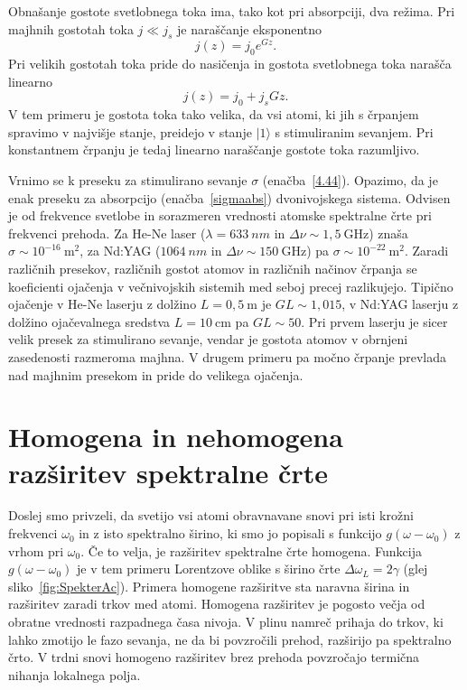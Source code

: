 Obnašanje gostote svetlobnega toka ima, tako kot pri absorpciji, dva režima. 
Pri majhnih gostotah toka $j\ll j_{s}$ je naraščanje eksponentno 
\begin{equation}
j(z)=j_{0}e^{Gz}.
\label{4.45}
\end{equation}
Pri velikih gostotah toka pride do nasičenja in gostota svetlobnega
toka narašča linearno
\begin{equation}
j(z)=j_{0}+j_{s}Gz.
\label{4.46}
\end{equation}
V tem primeru je gostota toka tako velika, da vsi atomi, ki jih
s črpanjem spravimo v najvišje stanje, preidejo v stanje $|1\rangle$
s stimuliranim sevanjem. Pri konstantnem črpanju je tedaj 
linearno naraščanje gostote toka razumljivo. 

Vrnimo se k preseku za stimulirano sevanje $\sigma$
 (enačba~\ref{4.44}). Opazimo, da je enak preseku za
absorpcijo (enačba~\ref{sigmaabs}) dvonivojskega sistema.
Odvisen je od frekvence svetlobe in sorazmeren vrednosti atomske spektralne 
črte pri frekvenci prehoda. Za He-Ne laser 
($\lambda=633~\si{nm}$ in $\Delta \nu \sim 1,5~\si{\giga\hertz}$) znaša   
$\sigma \sim 10^{-16}~\si{\metre}^2$, 
za Nd:YAG ($1064~\si{nm}$ in $\Delta \nu \sim 150~\si{\giga\hertz}$)
pa  $\sigma \sim 10^{-22}~\si{\metre}^2$.
Zaradi različnih presekov, različnih gostot atomov in različnih načinov črpanja se 
koeficienti ojačenja v večnivojskih sistemih med seboj precej razlikujejo. Tipično
ojačenje v He-Ne laserju z dolžino $L = 0,5~\si{\metre}$ je 
$GL \sim 1,015$, v Nd:YAG laserju z dolžino ojačevalnega sredstva 
$L = 10~\si{\centi\metre}$ pa $GL \sim 50$. Pri prvem laserju je sicer 
velik presek za stimulirano sevanje, vendar je gostota atomov v obrnjeni zasedenosti 
razmeroma majhna. V drugem primeru pa močno črpanje prevlada nad majhnim presekom 
in pride do velikega ojačenja.

\section{Homogena in nehomogena razširitev spektralne črte}
\label{Razsiritev}
Doslej smo privzeli, da svetijo vsi atomi obravnavane snovi
pri isti krožni frekvenci $\omega_{0}$ in z isto spektralno širino, ki smo
jo popisali s funkcijo $g(\omega-\omega_0)$ z vrhom pri $\omega_0$. Če to velja, 
je razširitev spektralne črte homogena. 
Funkcija $g(\omega-\omega_0)$ je v tem primeru Lorentzove oblike 
s širino črte $\Delta \omega_L = 2\gamma$ (glej sliko~\ref{fig:SpekterAc}). 
Primera homogene razširitve sta naravna širina in razširitev zaradi trkov med atomi.
Homogena razširitev je pogosto večja od obratne vrednosti razpadnega časa nivoja. 
V plinu namreč prihaja do trkov, ki lahko zmotijo le fazo sevanja, ne da bi povzročili 
prehod, razširijo pa spektralno črto. V trdni snovi homogeno razširitev 
brez prehoda povzročajo termična nihanja lokalnega polja. 

